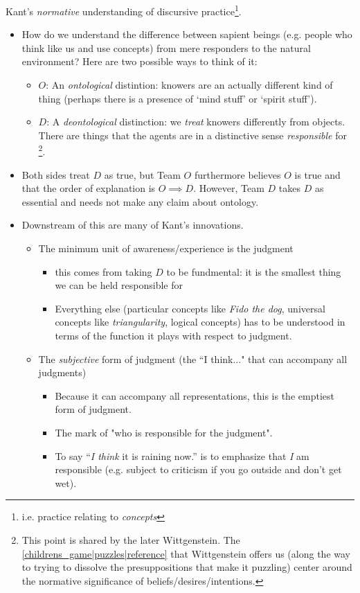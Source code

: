 Kant's \emph{normative} understanding of discursive practice\footnote{i.e. practice relating to \emph{concepts}}.

\begin{itemize}
    \item How do we understand the difference between sapient beings (e.g. people who think like us and use concepts) from mere responders to the natural environment? Here are two possible ways to think of it: \begin{itemize}
        \item $O$: An \emph{ontological} distintion: knowers are an actually different kind of thing (perhaps there is a presence of `mind stuff' or `spirit stuff').
        \item $D$: A \emph{deontological} distinction: we \emph{treat} knowers differently from objects. There are things that the agents are in a distinctive sense \emph{responsible} for \footnote{This point is shared by the later Wittgenstein. The \ref{childrens_game|puzzles|reference} that Wittgenstein offers us (along the way to trying to dissolve the presuppositions that make it puzzling) center around the normative significance of beliefs/desires/intentions.}.
    \end{itemize}
    \item Both sides treat $D$ as true, but Team $O$ furthermore believes $O$ is true and that the order of explanation is $O \implies D$. However, Team $D$ takes $D$ as essential and needs not make any claim about ontology.

    \item Downstream of this are many of Kant's innovations. \begin{itemize}
    \item The minimum unit of awareness/experience is the judgment \begin{itemize}
    \item this comes from taking $D$ to be fundmental: it is the smallest thing we can be held responsible for
    \item Everything else (particular concepts like \emph{Fido the dog}, universal concepts like \emph{triangularity}, logical concepts) has to be understood in terms of the function it plays with respect to judgment.
    \end{itemize}
    \item The \emph{subjective} form of judgment (the ``I think..." that can accompany all judgments)
    \begin{itemize}
    \item Because it can accompany all representations, this is the emptiest form of judgment.
    \item The mark of "who is responsible for the judgment".
    \item To say ``\emph{I think} it is raining now.'' is to emphasize that \emph{I} am responsible (e.g. subject to criticism if you go outside and don't get wet).


\end{itemize}
\end{itemize}
\end{itemize}
